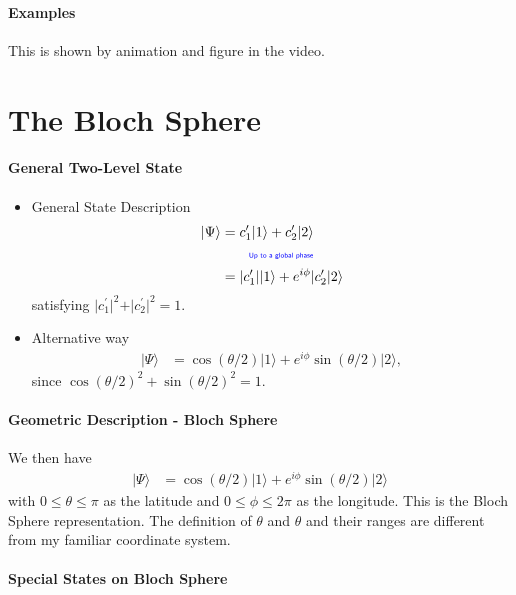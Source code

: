 \documentclass[../../note.tex]{subfiles}
\begin{document}
\paragraph{Examples}
This is shown by animation and figure in the video.



\section{The Bloch Sphere}
\paragraph{General Two-Level State}
\begin{itemize}
    \item General State Description
    \begin{align}
        \vert \Psi \rangle
        &= c_1^\prime \vert 1 \rangle + c_2^\prime \vert 2 \rangle \\
        &\qquad\text{\color{blue}{\tiny\sffamily Up to a global phase}} \\
        &= \vert c_1^\prime \vert \vert 1 \rangle + e^{i \phi} \vert c_2^\prime \vert 2 \rangle
    \end{align}
    satisfying $\vert c_1^\prime \vert^2 + \vert c_2^\prime \vert^2 = 1$.
    \item Alternative way
    \begin{align}
        \vert \Psi \rangle
        &= \cos(\theta/2) \vert 1 \rangle + e^{i \phi} \sin(\theta/2) \vert 2 \rangle,
    \end{align}
    since $\cos(\theta/2)^2 + \sin(\theta/2)^2 = 1$.
\end{itemize}

\paragraph{Geometric Description - Bloch Sphere}
We then have
\begin{align}
    \vert \Psi \rangle
    &= \cos(\theta/2) \vert 1 \rangle + e^{i \phi} \sin(\theta/2) \vert 2 \rangle
\end{align}
with $0 \leq \theta \leq \pi$ as the latitude and $0 \leq \phi \leq 2 \pi$ as the longitude. This is the Bloch Sphere representation. The definition of $\theta$ and $\theta$ and their ranges are different from my familiar coordinate system.

\paragraph{Special States on Bloch Sphere}
\end{document}
